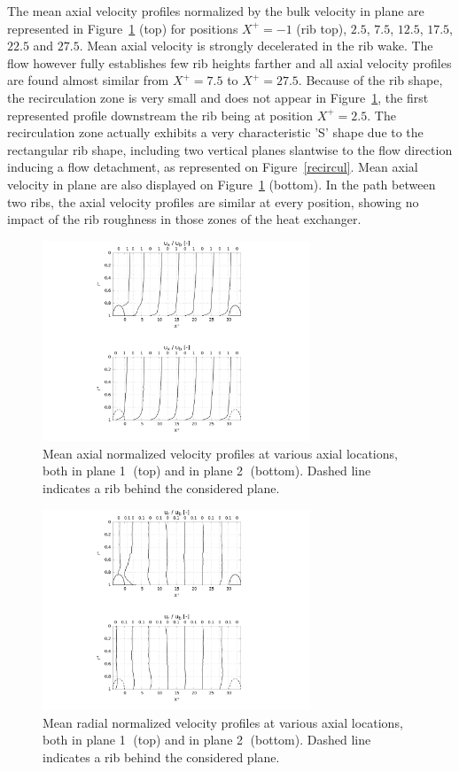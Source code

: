 The mean axial velocity profiles normalized by the bulk velocity in plane  are represented in Figure~\ref{Ux_mean} (top) for positions $X^+=-1$ (rib top), $2.5$, $7.5$, $12.5$, $17.5$, $22.5$ and $27.5$. Mean axial velocity is strongly decelerated in the rib wake. The flow however fully establishes few rib heights farther and all axial velocity profiles are found almost similar from $X^+=7.5$ to $X^+=27.5$. Because of the rib shape, the recirculation zone is very small and does not appear in Figure~\ref{Ux_mean}, the first represented profile downstream the rib being at position $X^+=2.5$. The recirculation zone actually exhibits a very characteristic 'S' shape due to the rectangular rib shape, including two vertical planes slantwise to the flow direction inducing a flow detachment, as represented on Figure~\ref{recircul}. Mean axial velocity in plane  are also displayed on Figure~\ref{Ux_mean} (bottom). In the path between two ribs, the axial velocity profiles are similar at every position, showing no impact of the rib roughness in those zones of the heat exchanger.\\

\begin{figure}[ht]
\centering
\includegraphics[width=8cm]{fig/applications/optim/Axial_vel.pdf}
\caption{Mean axial normalized velocity profiles at various axial locations, both in plane \textcircled{1} (top) and in plane \textcircled{2} (bottom). Dashed line indicates a rib behind the considered plane.}
\label{Ux_mean}
\end{figure}

\begin{figure}[ht]
\centering
\includegraphics[width=8cm]{fig/applications/optim/Radial_vel.pdf}
\caption{Mean radial normalized velocity profiles at various axial locations, both in plane \textcircled{1} (top) and in plane \textcircled{2} (bottom). Dashed line indicates a rib behind the considered plane.}
\label{Ur_mean}
\end{figure}

